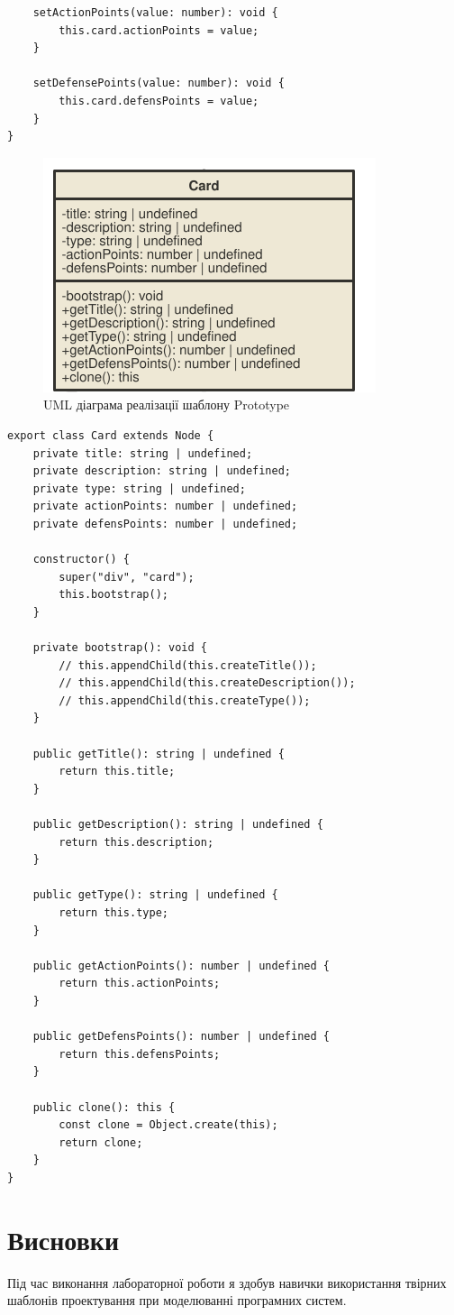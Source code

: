 \documentclass[oneside,14pt]{extarticle}
\begin{document}
\begin{normalsize}
\begin{small}
\begin{lstlisting}
	setActionPoints(value: number): void {
		this.card.actionPoints = value;
	}
	
	setDefensePoints(value: number): void {
		this.card.defensPoints = value;
	}
}

		\end{lstlisting}
	\end{small}
	
	\begin{figure}[H]
		\centering
		\includegraphics{prototype}
		\caption{UML діаграма реалізації шаблону Prototype}
	\end{figure}
	
	\begin{small}
		\begin{lstlisting}
export class Card extends Node {
	private title: string | undefined;
	private description: string | undefined;
	private type: string | undefined;
	private actionPoints: number | undefined;
	private defensPoints: number | undefined;
	
	constructor() {
		super("div", "card");
		this.bootstrap();
	}
	
	private bootstrap(): void {
		// this.appendChild(this.createTitle());
		// this.appendChild(this.createDescription());
		// this.appendChild(this.createType());
	}
	
	public getTitle(): string | undefined {
		return this.title;
	}
	
	public getDescription(): string | undefined {
		return this.description;
	}
	
	public getType(): string | undefined {
		return this.type;
	}
	
	public getActionPoints(): number | undefined {
		return this.actionPoints;
	}
	
	public getDefensPoints(): number | undefined {
		return this.defensPoints;
	}
	
	public clone(): this {
		const clone = Object.create(this);
		return clone;
	}
}

		\end{lstlisting}
	\end{small}
	
	\section*{Висновки}
	   Під час виконання лабораторної роботи я здобув навички використання твірних шаблонів проектування при моделюванні програмних систем.
\end{normalsize}
\end{document}
